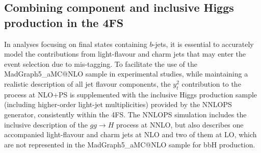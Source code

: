 \documentclass[11pt,a4paper]{article}
\begin{document}
\subsection[Combining $y_t^2$ \bbH{} component and inclusive Higgs production in the 4FS]{Combining  \bbH{} component and inclusive Higgs production in the 4FS}


In analyses focusing on final states containing $b$-jets, it is essential to accurately model the contributions 
from light-flavour and charm jets that may enter the event selection due to mis-tagging. 
To facilitate the use of the {\sc MadGraph5\_aMC@NLO} sample in experimental studies, 
while maintaining a realistic description of all jet flavour components, 
the $y_t^2$ contribution to the \bbH{} process at NLO+PS 
is supplemented with the inclusive Higgs production sample (including higher-order light-jet multiplicities) 
provided by the {\sc NNLOPS} generator, consistently within the 4FS.
The {\sc NNLOPS} simulation includes the inclusive description of the $gg \to H$ process at NNLO, but also describes 
one accompanied light-flavour and charm jets at NLO and two of them at LO, which are not represented in 
the {\sc MadGraph5\_aMC@NLO} sample for bbH{} production.
\end{document}
